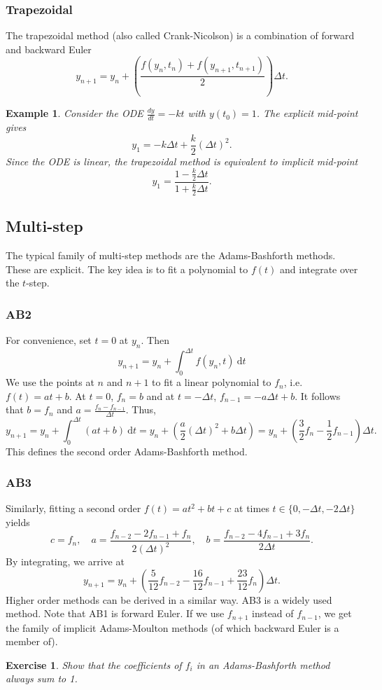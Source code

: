 \documentclass[11pt, a4paper]{article}
\theoremstyle{break}
\newtheorem{eg}[thm]{Example}
\newtheorem{ex}[thm]{Exercise}
\newcommand*{\set}[1]{\{#1\}}%
\newcommand*{\Paren}[1]{\left(#1\right)}%
\newcommand{\dt}{\Delta t}
\newcommand{\dder}[2]{\frac{d #1}{d #2}}
\newcommand{\dd}{\ \mathrm{d}}
\begin{document}
\subsubsection{Trapezoidal}
The trapezoidal method (also called Crank-Nicolson) is a combination of forward and backward Euler \[y_{n+1}=y_n+\Paren{\frac{f(y_n,t_n)+f(y_{n+1},t_{n+1})}{2}}\dt.\]

\begin{eg}
Consider the ODE $\dder yt=-kt$ with $y(t_0)=1$. The explicit mid-point gives \[y_1=-k\dt+\frac{k}{2}(\dt)^2.\] Since the ODE is linear, the trapezoidal method is equivalent to implicit mid-point \[y_1=\frac{1-\frac k2\dt}{1+\frac k2\dt}.\]
\end{eg}

\subsection{Multi-step}
The typical family of multi-step methods are the Adams-Bashforth methods. These are explicit. The key idea is to fit a polynomial to $f(t)$ and integrate over the $t$-step.
\subsubsection{AB2}
For convenience, set $t=0$ at $y_n$. Then \[y_{n+1}=y_n+\int_0^{\dt} f(y_n,t)\dd t\]
 We use the points at $n$ and $n+1$ to fit a linear polynomial to $f_n$, i.e. $f(t)=at+b$. At $t=0$, $f_n=b$ and at $t=-\dt$, $f_{n-1}=-a\dt+b$. It follows that $b=f_n$ and $a=\frac{f_n-f_{n-1}}{\dt}$. Thus, \[y_{n+1}=y_n+\int_0^{\dt}(at+b)\dd t=y_n+\Paren{\frac{a}2(\dt)^2+b\dt}=y_n+\Paren{\frac32f_n-\frac12f_{n-1}}\dt.\]
 This defines the second order Adams-Bashforth method.
\subsubsection{AB3}
Similarly, fitting a second order $f(t)=at^2+bt+c$ at times $t\in\set{0,-\dt,-2\dt}$ yields \[c=f_n,\quad a=\frac{f_{n-2}-2f_{n-1}+f_n}{2(\dt)^2}, \quad b=\frac{f_{n-2}-4f_{n-1}+3f_n}{2\dt}.\] By integrating, we arrive at \[y_{n+1}=y_n+\Paren{\frac5{12}f_{n-2}-\frac{16}{12}f_{n-1}+\frac{23}{12}f_n}\dt.\]
Higher order methods can be derived in a similar way. AB3 is a widely used method. Note that AB1 is forward Euler. If we use $f_{n+1}$ instead of $f_{n-1}$, we get the family of implicit Adams-Moulton methods (of which backward Euler is a member of).
\begin{ex}
	Show that the coefficients of $f_i$ in an Adams-Bashforth method always sum to 1.
\end{ex}
\end{document}
